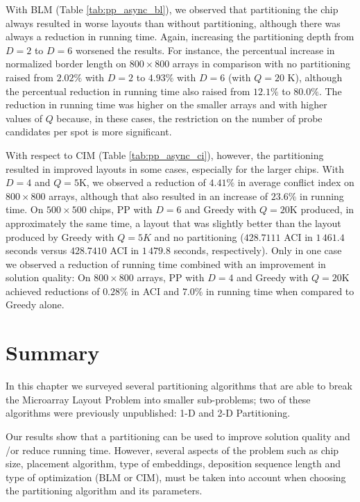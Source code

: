 With BLM (Table \ref{tab:pp_async_bl}), we observed that partitioning the chip
always resulted in worse layouts than without partitioning, although there was
always a reduction in running time. Again, increasing the partitioning depth
from $D=2$ to $D=6$ worsened the results. For instance, the percentual increase
in normalized border length on $800\times 800$ arrays in comparison with no
partitioning raised from $2.02\%$ with $D=2$ to $4.93\%$ with $D=6$ (with $Q=20$
K), although the percentual reduction in running time also raised from $12.1\%$
to $80.0\%$. The reduction in running time was higher on the smaller arrays and
with higher values of $Q$ because, in these cases, the restriction on the number
of probe candidates per spot is more significant.

With respect to CIM (Table \ref{tab:pp_async_ci}), however, the partitioning
resulted in improved layouts in some cases, especially for the larger chips.
With $D=4$ and $Q=5$K, we observed a reduction of $4.41\%$ in average conflict
index on $800\times 800$ arrays, although that also resulted in an increase of
$23.6\%$ in running time. On $500\times 500$ chips, PP with $D=6$ and Greedy
with $Q=20$K produced, in approximately the same time, a layout that was
slightly better than the layout produced by Greedy with $Q=5K$ and no
partitioning ($428.7111$ ACI in $1\,461.4$ seconds versus $428.7410$ ACI in
$1\,479.8$ seconds, respectively). Only in one case we observed a reduction of
running time combined with an improvement in solution quality: On
$800\times 800$ arrays, PP with $D=4$ and Greedy with $Q=20$K achieved
reductions of $0.28\%$ in ACI and $7.0\%$ in running time when compared to
Greedy alone.

\section{Summary}
\label{sec:part_summary}

In this chapter we surveyed several partitioning algorithms that are able to
break the Microarray Layout Problem into smaller sub-problems; two of these
algorithms were previously unpublished: 1-D and 2-D Partitioning.

Our results show that a partitioning can be used to improve solution quality and
/or reduce running time. However, several aspects of the problem such as chip
size, placement algorithm, type of embeddings, deposition sequence length and
type of optimization (BLM or CIM), must be taken into account when choosing the
partitioning algorithm and its parameters.

